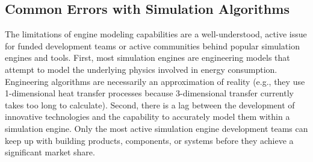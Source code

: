 \documentclass[preprint, review, 12pt]{elsarticle}
\begin{document}
\subsection{Common Errors with Simulation Algorithms}
The limitations of engine modeling capabilities are a well-understood, active issue for funded development teams or active communities behind popular simulation engines and tools. %
First, most simulation engines are engineering models that attempt to model the underlying physics involved in energy consumption. Engineering algorithms are necessarily an approximation of reality (e.g., they use 1-dimensional heat transfer processes because 3-dimensional transfer currently takes too long to calculate). %
Second, there is a lag between the development of innovative technologies and the capability to accurately model them within a simulation engine. Only the most active simulation engine development teams can keep up with building products, components, or systems before they achieve a significant market share. %
\end{document}

